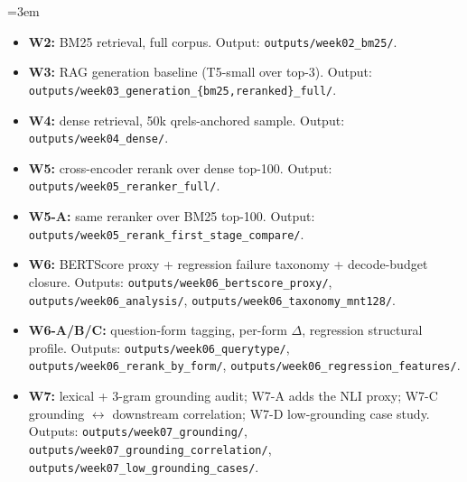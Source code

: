 \documentclass[11pt,a4paper]{article}
\newcommand{\bertscore}{BERTScore}
\newcommand{\bmtwofive}{BM25}
\newcommand{\code}[1]{\texttt{#1}}
\begin{document}
\begingroup
\sloppy
\emergencystretch=3em
\begin{itemize}
  \item \textbf{W2:} \bmtwofive{} retrieval, full corpus.  Output:
        \texttt{outputs/week02\_bm25/}.
  \item \textbf{W3:} RAG generation baseline (T5-small over top-3).
        Output:
        \code{outputs/week03\_\allowbreak generation\_\allowbreak \{bm25,reranked\}\_\allowbreak full/}.
  \item \textbf{W4:} dense retrieval, 50k qrels-anchored sample.
        Output: \texttt{outputs/week04\_dense/}.
  \item \textbf{W5:} cross-encoder rerank over dense top-100.
        Output: \texttt{outputs/week05\_reranker\_full/}.
  \item \textbf{W5-A:} same reranker over \bmtwofive{} top-100.
        Output:
        \code{outputs/week05\_\allowbreak rerank\_\allowbreak first\_\allowbreak stage\_\allowbreak compare/}.
  \item \textbf{W6:} \bertscore{} proxy + regression failure
        taxonomy + decode-budget closure.  Outputs:
        \code{outputs/week06\_\allowbreak bertscore\_\allowbreak proxy/},
        \code{outputs/week06\_\allowbreak analysis/},
        \code{outputs/week06\_\allowbreak taxonomy\_\allowbreak mnt128/}.
  \item \textbf{W6-A/B/C:} question-form tagging,
        per-form $\Delta$, regression structural profile.
        Outputs: \code{outputs/week06\_\allowbreak querytype/},
        \code{outputs/week06\_\allowbreak rerank\_\allowbreak by\_\allowbreak form/},
        \code{outputs/week06\_\allowbreak regression\_\allowbreak features/}.
  \item \textbf{W7:} lexical + 3-gram grounding audit; W7-A adds
        the NLI proxy; W7-C grounding $\leftrightarrow$ downstream
        correlation; W7-D low-grounding case study.  Outputs:
        \code{outputs/week07\_\allowbreak grounding/},
        \code{outputs/week07\_\allowbreak grounding\_\allowbreak correlation/},
        \code{outputs/week07\_\allowbreak low\_\allowbreak grounding\_\allowbreak cases/}.
\end{itemize}
\endgroup
\end{document}
